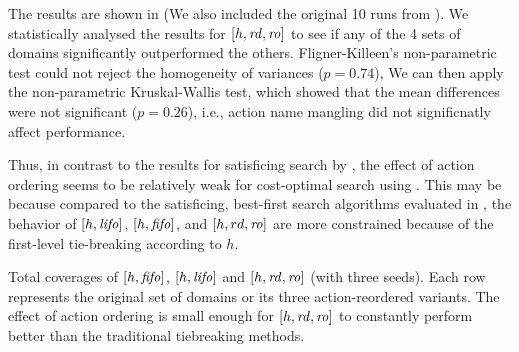 The results are shown in  (We
also included the original 10 runs from  ).
We statistically analysed the results for $[h,\mbox{\textit{rd}},\mbox{\textit{ro}}]$ 
to see if any of the 4 sets of domains
significantly outperformed the others.
Fligner-Killeen's non-parametric test could not reject the homogeneity of variances ($p=0.74$),
We can then apply the non-parametric Kruskal-Wallis test,
which showed that the mean differences were not significant ($p=0.26$),
i.e., action name mangling did not significnatly affect performance.

Thus, in contrast to the results for satisficing search by \cite{vallati2015effective}, 
the effect of action ordering  seems to be relatively weak for cost-optimal search using \astar.
This may be because 
compared to the satisficing, best-first search algorithms evaluated in \cite{vallati2015effective},
the behavior of $[h,\mbox{\textit{lifo}}]$, $[h,\mbox{\textit{fifo}}]$, and $[h,rd,\mbox{\textit{ro}}]$ are more
constrained because of the first-level tie-breaking according to $h$.

\begin{table}[tb]
 \setlength{\tabcolsep}{0.2em}
 \centering {}
 
 \caption{Total coverages of $[h,\mbox{\textit{fifo}}]$, $[h,\mbox{\textit{lifo}}]$
 and $[h,\mbox{\textit{rd}},\mbox{\textit{ro}}]$ (with three seeds). Each row represents the original set of
 domains or its three action-reordered variants. The effect
 of action ordering is small enough for $[h,\mbox{\textit{rd}},\mbox{\textit{ro}}]$ to
 constantly perform better than the traditional tiebreaking methods.}
 \label{actionordering-robustness}
\end{table}

